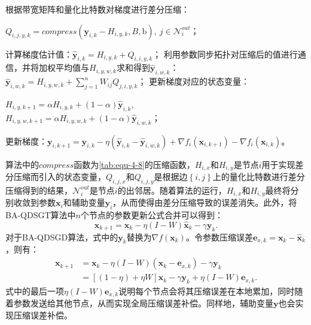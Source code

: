 \begin{center}
\begin{algorithm}[!htbp]
\begin{algorithmic}[1]
                \STATE 根据带宽矩阵和量化比特数对梯度进行差分压缩：\\\begin{center}$Q_{i,j,y,k}=compress\left( \boldsymbol{y}_{i,k}-H_{i,y,k},B,\mathrm{b} \right) ,\ j\in \mathcal{N} _{i}^{out} $；\end{center}
                \STATE 计算梯度估计值：$\hat{\boldsymbol{y}}_{i,k}=H_{i,y,k}+Q_{i,i,y,k}$；
                \STATE 利用参数同步拓扑对压缩后的值进行通信，并将加权平均值与$H_{i,y,w,k}$求和得到$\hat{\boldsymbol{y}}_{i,w,k}$：$\hat{\boldsymbol{y}}_{i,w,k}=H_{i,y,w,k}+\sum_{j=1}^n{W_{ij}}Q_{j,i,y,k}$；
                \STATE 更新梯度对应的状态变量：\\\begin{center}$H_{i,y,k+1}=\alpha H_{i,y,k}+\left( 1-\alpha \right) \hat{\boldsymbol{y}}_{i,k},$\\$H_{i,y,w,k+1}=\alpha H_{i,y,w,k}+\left( 1-\alpha \right) \hat{\boldsymbol{y}}_{i,w,k}$；\end{center}
                \STATE 更新梯度：$\boldsymbol{y}_{i,k+1}=\boldsymbol{y}_{i,k}-\eta \left( \hat{\boldsymbol{y}}_{i,k}-\hat{\boldsymbol{y}}_{i,w,k} \right) +\nabla f_i\left( \boldsymbol{x}_{i,k+1} \right) -\nabla f_i\left( \boldsymbol{x}_{i,k} \right) $。
            \ENDFOR            
            \end{algorithmic}
    \end{algorithm}
\end{center}

算法中的$compress$函数为\autoref{tab:equ-4-8}的压缩函数，$H_{i,x}$和$H_{i,y}$是节点$i$用于实现差分压缩而引入的状态变量，$Q_{i,j,x}$和$Q_{i,j,y}$是根据边$\left\{ i,j \right\} $上的量化比特数进行差分压缩得到的结果，$\mathcal{N} _{i}^{out}$是节点$i$的出邻居。随着算法的运行，$H_{i,x}$和$H_{i,y}$最终将分别收敛到参数$\boldsymbol{x}_i$和辅助变量$\boldsymbol{y}_i$，从而使得由差分压缩导致的误差消失。此外，将BA-QDSGT算法中$n$个节点的参数更新公式合并可以得到：
\begin{equation}
    \label{tab:equ-4-13}
    \boldsymbol{x}_{k+1}=\boldsymbol{x}_k-\eta \left( I-W \right) \hat{\boldsymbol{x}}_k-\gamma \boldsymbol{y}_k.
\end{equation}
对于BA-QDSGD算法，式中的$\boldsymbol{y}_k$替换为$\nabla f\left( \boldsymbol{x}_k \right) $。令参数压缩误差$\boldsymbol{e}_{x,k}=\boldsymbol{x}_k-\hat{\boldsymbol{x}}_k$，则有：
\begin{equation}
    \label{tab:equ-4-14}
    \begin{aligned}
        \boldsymbol{x}_{k+1}&=\boldsymbol{x}_k-\eta \left( I-W \right) \left( \boldsymbol{x}_k-\boldsymbol{e}_{x,k} \right) -\gamma \boldsymbol{y}_k
        \\
        &=\left[ \left( 1-\eta \right) +\eta W \right] \boldsymbol{x}_k-\gamma \boldsymbol{y}_k+\eta \left( I-W \right) \boldsymbol{e}_{x,k}.
    \end{aligned}
\end{equation}
式中的最后一项$\eta \left( I-W \right) \boldsymbol{e}_{x,k}$说明每个节点会将其压缩误差在本地累加，同时随着参数发送给其他节点，从而实现全局压缩误差补偿。同样地，辅助变量$\boldsymbol{y}$也会实现压缩误差补偿。

